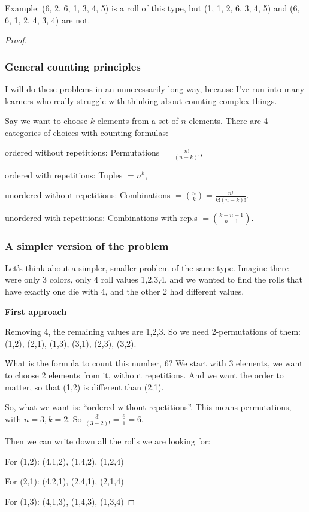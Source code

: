 \documentclass[14pt]{extarticle}
\begin{document}
Example: (6, 2, 6, 1, 3, 4, 5) is a roll of this type, but (1, 1, 2, 6, 3, 4, 5) and (6, 6, 1, 2, 4, 3, 4) are not.
\begin{proof}
\subsubsection{General counting principles}
I will do these problems in an unnecessarily long way, because I've run into many learners who really struggle with thinking about counting complex things.

Say we want to choose $k$ elements from a set of $n$ elements. There are 4 categories of choices with counting formulas: 

ordered without repetitions: Permutations $\displaystyle = \frac{n!}{(n-k)!}$,

ordered with repetitions: Tuples $ = n^k$,

unordered without repetitions: Combinations $\displaystyle = \binom{n}{k} = \frac{n!}{k!(n-k)!}$.

unordered with repetitions: Combinations with rep.s $\displaystyle = \binom{k+n-1}{n-1}$.

\subsubsection{A simpler version of the problem}
Let's think about a simpler, smaller problem of the same type. Imagine there were only 3 colors, only 4 roll values 1,2,3,4, and we wanted to find the rolls that have exactly one die with 4, and the other 2 had different values.

{\bf First approach}

Removing 4, the remaining values are 1,2,3. So we need 2-permutations of them: (1,2), (2,1), (1,3), (3,1), (2,3), (3,2). 

What is the formula to count this number, 6? We start with 3 elements, we want to choose 2 elements from it, without repetitions. And we want the order to matter, so that (1,2) is different than (2,1).

So, what we want is: ``ordered without repetitions''. This means permutations, with $n = 3, k = 2$. So $\frac{3!}{(3-2)!} = \frac{6}{1} = 6$.

Then we can write down all the rolls we are looking for:

For (1,2): (4,1,2), (1,4,2), (1,2,4)

For (2,1): (4,2,1), (2,4,1), (2,1,4)

For (1,3): (4,1,3), (1,4,3), (1,3,4)


\end{proof}
\end{document}
